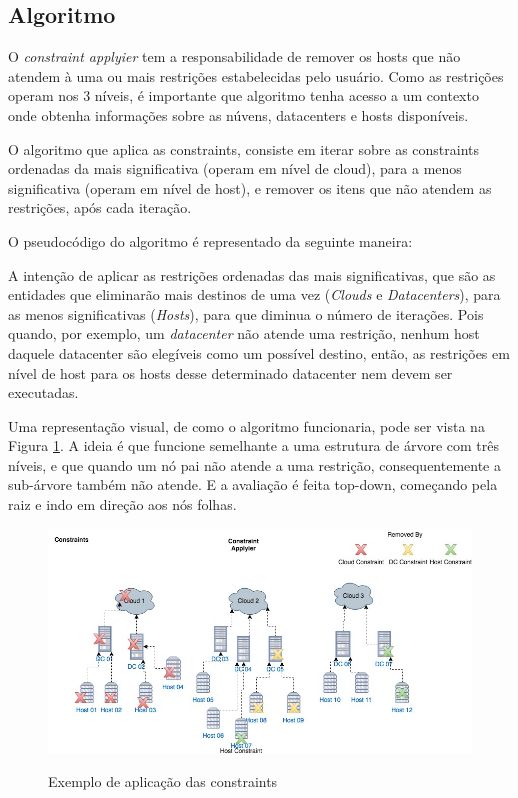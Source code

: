 \subsection{Algoritmo}
O \textit{constraint applyier} tem a responsabilidade de remover os hosts que não atendem à
uma ou mais restrições estabelecidas pelo usuário. Como as restrições operam nos 3 níveis,
é importante que algoritmo tenha acesso a um contexto onde obtenha informações sobre as núvens, 
datacenters e hosts disponíveis.

O algoritmo que aplica as constraints, consiste em iterar sobre as constraints ordenadas da mais significativa 
(operam em nível de cloud), para a menos significativa (operam em nível de host), e remover os itens que não atendem as
restrições, após cada iteração.

O pseudocódigo do algoritmo é representado da seguinte maneira:



A intenção de aplicar as restrições ordenadas das mais significativas, que são as 
entidades que eliminarão mais destinos de uma vez (\textit{Clouds} e \textit{Datacenters}),
para as menos significativas (\textit{Hosts}), para que diminua o número de iterações.
Pois quando, por exemplo, um \textit{datacenter} não atende uma restrição, nenhum host daquele datacenter 
são elegíveis como um possível destino, então, as restrições em nível de host para
os hosts desse determinado datacenter nem devem ser executadas. 

Uma representação visual, de como o algoritmo funcionaria, pode ser vista na Figura \ref{fig:constraintapplyier}. 
A ideia é que funcione semelhante a uma estrutura de árvore com três níveis, e que quando um nó pai não atende 
a uma restrição, consequentemente a sub-árvore também não atende. E a avaliação é feita top-down, começando pela
raiz e indo em direção aos nós folhas.

\begin{figure}[!htb]
  \centering
  \caption{Exemplo de aplicação das constraints}
  \includegraphics[width=1\textwidth]{./dados/figuras/constraintapplyier}
  \label{fig:constraintapplyier}
\end{figure}

